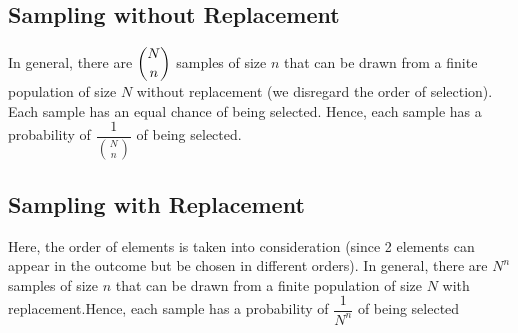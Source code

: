 \subsection{Sampling without Replacement}
In general, there are $\dbinom{N}{n}$ samples of size $n$ that can be drawn from a finite population of size $N$ without replacement (we disregard the order of selection). Each sample has an equal chance of being selected. Hence, each sample has a probability of $\dfrac{1}{\binom{N}{n}}$ of being selected.
\subsection{Sampling with Replacement}
Here, the order of elements is taken into consideration (since 2 elements can appear in the outcome but be chosen in different orders). In general, there are $N^n$ samples of size $n$ that can be drawn from a finite population of size $N$ with replacement.Hence, each sample has a probability of $\dfrac{1}{N^n}$ of being selected
